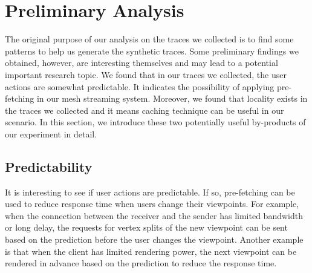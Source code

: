 
\section{Preliminary Analysis}
The original purpose of our analysis on the traces we collected
is to find some patterns to help us generate the synthetic traces. 
Some preliminary findings we obtained, however, are interesting themselves and 
may lead to a potential important research topic. We found that 
in our traces we collected, the user actions are somewhat predictable.
It indicates the possibility of applying pre-fetching in our mesh streaming
system. Moreover, we found that locality exists in the traces we collected and
it means caching technique can be useful in our scenario.
In this section, we introduce these two potentially useful
by-products of our experiment in detail. 

\subsection{Predictability}
\label{ss:user:predictability}
It is interesting to see if user actions are predictable. 
If so, pre-fetching can be used to reduce response time when
users change their viewpoints. 
For example, when the connection between the 
receiver and the sender has limited bandwidth
or long delay, the requests for vertex splits of the new viewpoint 
can be sent based on the prediction before the user changes the viewpoint.
Another example is that when the client has limited
rendering power, the next viewpoint can be rendered
in advance based on the prediction to reduce the response time. 

